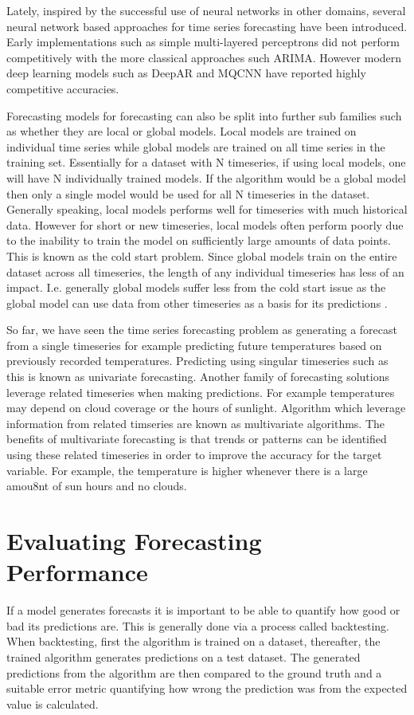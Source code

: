 Lately, inspired by the successful use of neural networks in other domains, several neural network based approaches for time series forecasting have been introduced. Early implementations such as simple multi-layered perceptrons did not perform competitively with the more classical approaches such ARIMA. However modern deep learning models such as DeepAR \cite{salinas_deepar_2019} and MQCNN \cite{wen_multi-horizon_2018} have reported highly competitive accuracies.

Forecasting models for forecasting can also be split into further sub families such as whether they are local or global models. Local models are trained on individual time series while global models are trained on all time series in the training set. Essentially for a dataset with N timeseries, if using local models, one will have N individually trained models. If the algorithm would be a global model then only a single model would be used for all N timeseries in the dataset. Generally speaking, local models performs well for timeseries with much historical data. However for short or new timeseries, local models often perform poorly due to the inability to train the model on sufficiently large amounts of data points. This is known as the cold start problem. Since global models train on the entire dataset across all timeseries, the length of any individual timeseries has less of an impact. I.e. generally global models suffer less from the cold start issue as the global model can use data from other timeseries as a basis for its predictions \cite{wang_deep_2019}.

So far, we have seen the time series forecasting problem as generating a forecast from a single timeseries for example predicting future temperatures based on previously recorded temperatures. Predicting using singular timeseries such as this is known as univariate forecasting. Another family of forecasting solutions leverage related timeseries when making predictions. For example temperatures may depend on cloud coverage or the hours of sunlight. Algorithm which leverage information from related timseries are known as multivariate algorithms. The benefits of multivariate forecasting is that trends or patterns can be identified using these related timeseries in order to improve the accuracy for the target variable. For example, the temperature is higher whenever there is a large amou8nt of sun hours and no clouds.

\section{Evaluating Forecasting Performance}
\label{sec:evaluating_performance}
If a model generates forecasts it is important to be able to quantify how good or bad its predictions are. This is generally done via a process called backtesting. When backtesting, first the algorithm is trained on a dataset, thereafter, the trained algorithm generates predictions on a test dataset. The generated predictions from the algorithm are then compared to the ground truth and a suitable error metric quantifying how wrong the prediction was from the expected value is calculated.

